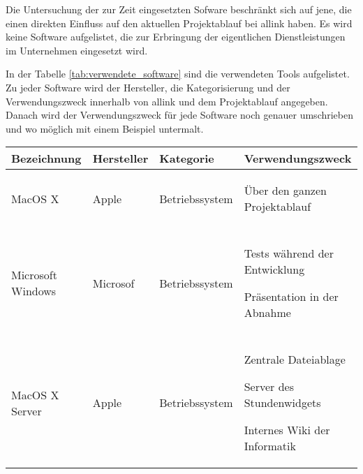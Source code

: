 Die Untersuchung der zur Zeit eingesetzten Sofware beschränkt sich auf jene,
die einen direkten Einfluss auf den aktuellen Projektablauf bei allink haben.
Es wird keine Software aufgelistet, die zur Erbringung der eigentlichen 
Dienstleistungen im Unternehmen eingesetzt wird.

In der Tabelle \ref{tab:verwendete_software} sind die verwendeten Tools
aufgelistet. Zu jeder Software wird der Hersteller, die Kategorisierung und der 
Verwendungszweck innerhalb von allink und dem Projektablauf angegeben. Danach
wird der Verwendungszweck für jede Software noch genauer umschrieben und wo
möglich mit einem Beispiel untermalt.

\begin{longtable}{lllp{6cm}}
    \toprule \textbf{Bezeichnung} & \textbf{Hersteller} & \textbf{Kategorie} & \textbf{Verwendungszweck} \\
    \midrule MacOS X & Apple & Betriebssystem & 
        \begin{minipage}[t]{6cm}
            \begin{compactitem}
                \item Über den ganzen Projektablauf
            \end{compactitem}
        \end{minipage}
        \\\\
    \midrule Microsoft Windows & Microsof & Betriebssystem & 
        \begin{minipage}[t]{6cm}
            \begin{compactitem}
                \item Tests während der Entwicklung
                \item Präsentation in der Abnahme
            \end{compactitem}
        \end{minipage}
        \\\\
    \midrule MacOS X Server & Apple & Betriebssystem &
        \begin{minipage}[t]{6cm}
            \begin{compactitem}
                \item Zentrale Dateiablage
                \item Server des Stundenwidgets
                \item Internes Wiki der Informatik
            \end{compactitem}
        \end{minipage}

\end{longtable}
